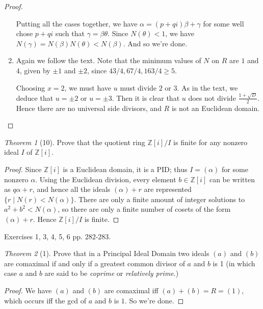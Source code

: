 \documentclass[12pt]{article}
\theoremstyle{remark}
\theoremstyle{named}
\newtheorem*{theorem}{Theorem}
\renewcommand{\a}{\alpha}
\renewcommand{\b}{\beta}
\newcommand{\Z}{\mathbb Z}
\begin{document}
\begin{proof}
\begin{enumerate}
        Putting all the cases together, we have \(\a = (p + qi)\b + \gamma\) for some well chose \(p + qi\) such that \(\gamma = \b \theta\). Since \(N(\theta) < 1\), we have \(N(\gamma) = N(\b)N(\theta) < N(\b)\). And so we're done. 

        \item Again we follow the text. Note that the minimum values of \(N\) on \(R\) are \(1\) and \(4\), given by \(\pm 1\) and \(\pm 2\), since \(43/4, 67/4, 163/4 \ge 5\). 
        
        Choosing \(x = 2\), we must have \(u\) must divide \(2\) or \(3\). As in the text, we deduce that \(u = \pm 2\) or \(u = \pm 3\). Then it is clear that \(u\) does not divide \(\frac{1 + \sqrt{D}}{2}\). Hence there are no universal side divisors, and \(R\) is not an Euclidean domain. 
    \end{enumerate}
\end{proof}

\begin{theorem}[10]
    Prove that the quotient ring \(\Z[i]/I\) is finite for any nonzero ideal \(I\) of \(\Z[i]\).
\end{theorem}

\begin{proof}
    Since \(\Z[i]\) is a Euclidean domain, it is a PID; thus \(I = (\a)\) for some nonzero \(\a\). Using the Euclidean division, every element \(b \in \Z[i]\) can be written as \(q\a + r\), and hence all the ideals \((\a) + r\) are represented \(\{r \mid N(r) < N(\a)\}\). There are only a finite amount of integer solutions to \(a^2 + b^2 < N(\a)\), so there are only a finite number of cosets of the form \((\a) + r\). Hence \(\Z[i] / I\) is finite. 
\end{proof}

Exercises 1, 3, 4, 5, 6 pp. 282-283.

\begin{theorem}[1]
    Prove that in a Principal Ideal Domain two ideals \((a)\) and \((b)\) are comaximal if and only if a greatest common divisor of \(a\) and \(b\) is 1 (in which case \(a\) and \(b\) are said to be \textit{coprime} or \textit{relatively prime}.)
\end{theorem}

\begin{proof}
    We have \((a)\) and \((b)\) are comaximal iff \((a) + (b) = R = (1)\), which occurs iff the gcd of \(a\) and \(b\) is \(1\). So we're done.
\end{proof}
\end{document}
